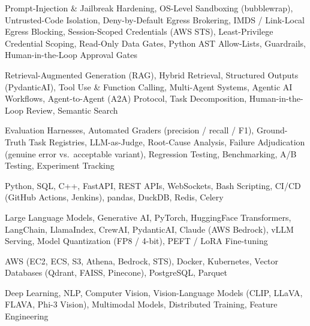 \documentclass[letter,10pt]{article}
\begin{document}
 Prompt-Injection \& Jailbreak Hardening, OS-Level Sandboxing (bubblewrap), Untrusted-Code Isolation, Deny-by-Default Egress Brokering, IMDS / Link-Local Egress Blocking, Session-Scoped Credentials (AWS STS), Least-Privilege Credential Scoping, Read-Only Data Gates, Python AST Allow-Lists, Guardrails, Human-in-the-Loop Approval Gates\par\vspace{2pt}

 Retrieval-Augmented Generation (RAG), Hybrid Retrieval, Structured Outputs (PydanticAI), Tool Use \& Function Calling, Multi-Agent Systems, Agentic AI Workflows, Agent-to-Agent (A2A) Protocol, Task Decomposition, Human-in-the-Loop Review, Semantic Search\par\vspace{2pt}

 Evaluation Harnesses, Automated Graders (precision / recall / F1), Ground-Truth Task Registries, LLM-as-Judge, Root-Cause Analysis, Failure Adjudication (genuine error vs.\ acceptable variant), Regression Testing, Benchmarking, A/B Testing, Experiment Tracking\par\vspace{2pt}

 Python, SQL, C++, FastAPI, REST APIs, WebSockets, Bash Scripting, CI/CD (GitHub Actions, Jenkins), pandas, DuckDB, Redis, Celery\par\vspace{2pt}

 Large Language Models, Generative AI, PyTorch, HuggingFace Transformers, LangChain, LlamaIndex, CrewAI, PydanticAI, Claude (AWS Bedrock), vLLM Serving, Model Quantization (FP8 / 4-bit), PEFT / LoRA Fine-tuning\par\vspace{2pt}

 AWS (EC2, ECS, S3, Athena, Bedrock, STS), Docker, Kubernetes, Vector Databases (Qdrant, FAISS, Pinecone), PostgreSQL, Parquet\par\vspace{2pt}

 Deep Learning, NLP, Computer Vision, Vision-Language Models (CLIP, LLaVA, FLAVA, Phi-3 Vision), Multimodal Models, Distributed Training, Feature Engineering
\end{document}
